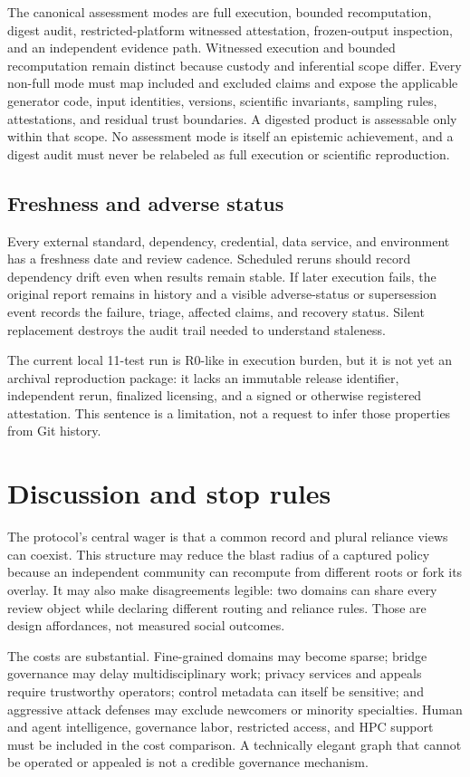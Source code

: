 \documentclass[11pt]{article}
\begin{document}
The canonical assessment modes are full execution, bounded recomputation, digest
audit, restricted-platform witnessed attestation, frozen-output inspection, and an
independent evidence path. Witnessed execution and bounded recomputation remain
distinct because custody and inferential scope differ. Every non-full mode must map
included and excluded claims and expose the applicable generator code, input
identities, versions, scientific invariants, sampling rules, attestations, and
residual trust boundaries. A digested product is assessable only within that scope.
No assessment mode is itself an epistemic achievement, and a digest audit must
never be relabeled as full execution or scientific reproduction.

\subsection{Freshness and adverse status}

Every external standard, dependency, credential, data service, and environment has
a freshness date and review cadence. Scheduled reruns should record dependency
drift even when results remain stable. If later execution fails, the original report
remains in history and a visible adverse-status or supersession event records the
failure, triage, affected claims, and recovery status. Silent replacement destroys
the audit trail needed to understand staleness.

The current local 11-test run is R0-like in execution burden, but it is not yet an
archival reproduction package: it lacks an immutable release identifier, independent
rerun, finalized licensing, and a signed or otherwise registered attestation. This
sentence is a limitation, not a request to infer those properties from Git history.

\section{Discussion and stop rules}

The protocol's central wager is that a common record and plural reliance views can
coexist. This structure may reduce the blast radius of a captured policy because an
independent community can recompute from different roots or fork its overlay. It may
also make disagreements legible: two domains can share every review object while
declaring different routing and reliance rules. Those are design affordances, not
measured social outcomes.

The costs are substantial. Fine-grained domains may become sparse; bridge governance
may delay multidisciplinary work; privacy services and appeals require trustworthy
operators; control metadata can itself be sensitive; and aggressive attack defenses
may exclude newcomers or minority specialties. Human and agent intelligence,
governance labor, restricted access, and HPC support must be included in the cost
comparison. A technically elegant graph that cannot be operated or appealed is not
a credible governance mechanism.
\end{document}
